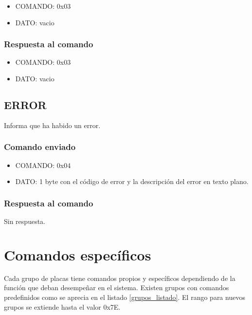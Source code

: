 \documentclass[a4paper,11pt]{article}
\begin{document}
\begin{itemize}
	\item{COMANDO:} 0x03
	\item{DATO:} vacio
\end{itemize}

\subsubsection*{Respuesta al comando}
\label{ping_respuesta}

\begin{itemize}
	\item{COMANDO:} 0x03
	\item{DATO:} vacio
\end{itemize}

\subsection{ERROR}
\label{error}

Informa que ha habido un error.

\subsubsection*{Comando enviado}
\label{error_comando_enviado}

\begin{itemize}
	\item{COMANDO:} 0x04
	\item{DATO:} 1 byte con el c\'odigo de error y la descripci\'on del error en texto plano.
\end{itemize}

\subsubsection*{Respuesta al comando}
\label{error_respuesta}

Sin respuesta.

\section{Comandos espec\'ificos}
\label{comandos_especificos}

Cada grupo de placas tiene comandos propios y espec\'ificos dependiendo de la funci\'on que deban desempe\~nar en el sistema.
Existen grupos con comandos predefinidos como se aprecia en el listado \ref{grupos_listado}.
El rango para nuevos grupos se extiende hasta el valor 0x7E.
\end{document}
